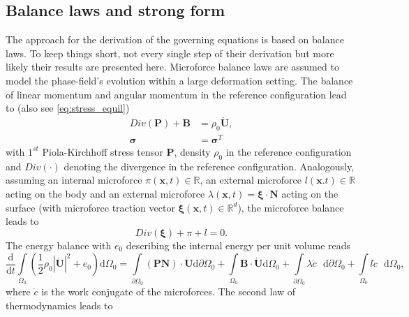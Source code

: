 \subsection{Balance laws and strong form} \label{appsec:balance_laws}
The approach for the derivation of the governing equations is based on balance laws. To keep things short, not every single step of their derivation but more likely their results are presented here. Microforce balance laws are assumed to model the phase-field's evolution within a large deformation setting. The balance of linear momentum and angular momentum in the reference configuration lead to (also see \eqref{eq:stress_equil})
\begin{equation} \label{eq:lin_mom_ang_mom}
	\begin{aligned}
		Div\left(\mathbf{P}\right)+\mathbf{B}&=\rho_{0}\ddot{\mathbf{U}}, \\
		\bm{\sigma} &= \bm{\sigma}^{T}
	\end{aligned}
\end{equation}
with $1^{st}$ Piola-Kirchhoff stress tensor $\mathbf{P}$, density $\rho_{0}$ in the reference configuration and $Div\left(\cdot\right)$ denoting the divergence in the reference configuration. Analogously, assuming an internal microforce $\pi\left(\mathbf{x},t\right)\in\mathbb{R}$, an external microforce $l\left(\mathbf{x}.t\right)\in\mathbb{R}$ acting on the body and an external microforce $\lambda\left(\mathbf{x},t\right)=\bm{\xi}\cdot\mathbf{N}$ acting on the surface (with microforce traction vector $\bm{\xi}\left(\mathbf{x},t\right)\in\mathbb{R}^{d}$), the microforce balance leads to
\begin{equation} \label{eq:microforce_balance}
	Div\left(\bm{\xi}\right)+\pi+l=0.
\end{equation}
The energy balance with $e_{0}$ describing the internal energy per unit volume reads
\begin{equation} \label{eq:energy_balance}
	\dfrac{\mathrm{d}}{\mathrm{d}t}\int\limits_{\Omega_{0}}\left(\dfrac{1}{2}\rho_{0}|\dot{\mathbf{U}}|^{2}+e_{0}\right)\mathrm{d}\Omega_{0} = 
	\int\limits_{\partial\Omega_{0}}\left(\mathbf{P}\mathbf{N}\right)\cdot\dot{\mathbf{U}}\mathrm{d}\partial\Omega_{0}+\int\limits_{\Omega_{0}}\mathbf{B}\cdot\dot{\mathbf{U}}\mathrm{d}\Omega_{0}+\int\limits_{\partial\Omega_{0}}\lambda\dot{c}\text{ }\mathrm{d}\partial\Omega_{0}+\int\limits_{\Omega_{0}}l\dot{c}\text{ }\mathrm{d}\Omega_{0},
\end{equation}
where $\dot{c}$ is the work conjugate of the microforces. The second law of thermodynamics leads to
